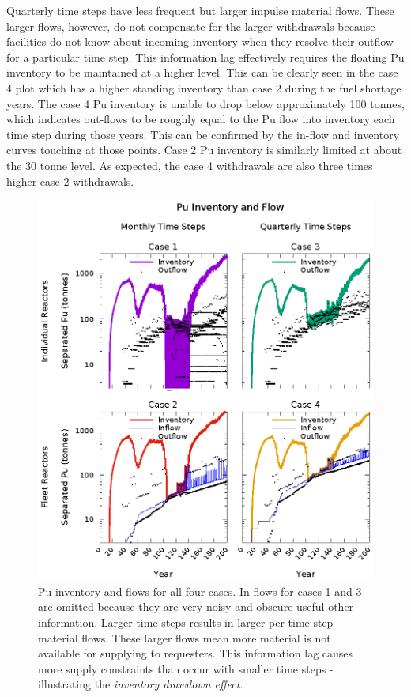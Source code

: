 \documentclass{style}
\begin{document}
Quarterly time steps have less frequent but larger impulse material flows.
These larger flows, however, do not compensate for the larger withdrawals
because facilities do not know about incoming inventory when they resolve
their outflow for a particular time step.  This information lag effectively
requires the floating Pu inventory to be maintained at a higher level.  This
can be clearly seen in the case 4 plot which has a higher standing inventory
than case 2 during the fuel shortage years.  The case 4 Pu inventory is unable
to drop below approximately 100 tonnes, which indicates out-flows to be
roughly equal to the Pu flow into inventory each time step during those years.
This can be confirmed by the in-flow and inventory curves touching at those
points.  Case 2 Pu inventory is similarly limited at about the 30 tonne level.
As expected, the case 4 withdrawals are also three times higher case 2
withdrawals.

\begin{figure}[!h]
    \centering
    \includegraphics[width=1.0\textwidth]{exp2/puinv.eps}
    \caption[Pu inventory and flow]{
        Pu inventory and flows for all four cases.  In-flows for cases 1 and 3
        are omitted because they are very noisy and obscure useful other
        information.  Larger time steps results in larger per time step
        material flows. These larger flows mean more material is not available
        for supplying to requesters.  This information lag causes more supply
        constraints than occur with smaller time steps - illustrating the
        \emph{inventory drawdown effect}.
    }
    \label{fig:puinv}
\end{figure}
\end{document}
